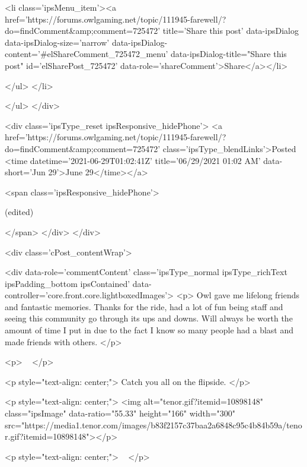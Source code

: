 						
							<li class='ipsMenu_item'><a href='https://forums.owlgaming.net/topic/111945-farewell/?do=findComment&amp;comment=725472' title='Share this post' data-ipsDialog data-ipsDialog-size='narrow' data-ipsDialog-content='#elShareComment_725472_menu' data-ipsDialog-title="Share this post" id='elSharePost_725472' data-role='shareComment'>Share</a></li>
						
                        
						
						
						
							
								
							
							
							
							
							
							
						
					</ul>
				</li>
				
			</ul>
		</div>

		<div class='ipsType_reset ipsResponsive_hidePhone'>
			<a href='https://forums.owlgaming.net/topic/111945-farewell/?do=findComment&amp;comment=725472' class='ipsType_blendLinks'>Posted <time datetime='2021-06-29T01:02:41Z' title='06/29/2021 01:02  AM' data-short='Jun 29'>June 29</time></a> 
			
			<span class='ipsResponsive_hidePhone'>
				
					(edited)
				
				
			</span>
		</div>
	</div>

	

    

	<div class='cPost_contentWrap'>
		
		<div data-role='commentContent' class='ipsType_normal ipsType_richText ipsPadding_bottom ipsContained' data-controller='core.front.core.lightboxedImages'>
			<p>
	Owl gave me lifelong friends and fantastic memories. Thanks for the ride, had a lot of fun being staff and seeing this community go through its ups and downs. Will always be worth the amount of time I put in due to the fact I know so many people had a blast and made friends with others.
</p>

<p>
	 
</p>

<p style="text-align: center;">
	Catch you all on the flipside.
</p>

<p style="text-align: center;">
	<img alt="tenor.gif?itemid=10898148" class="ipsImage" data-ratio="55.33" height="166" width="300" src="https://media1.tenor.com/images/b83f2157c37baa2a6848c95c4b84b59a/tenor.gif?itemid=10898148"></p>

<p style="text-align: center;">
	 
</p>

